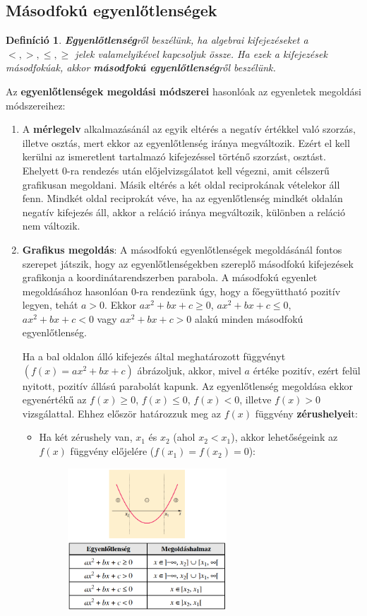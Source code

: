 \documentclass[12pt,a4paper]{article}
\newtheorem{definition}{Definíció} [section]
\begin{document}
\subsection{Másodfokú egyenlőtlenségek}
\begin{definition}
\textbf{Egyenlőtlenség}ről beszélünk, ha algebrai kifejezéseket a $<, >, \leq, \geq$ jelek valamelyikével kapcsoljuk össze. Ha ezek a kifejezések másodfokúak, akkor \textbf{másodfokú egyenlőtlenség}ről beszélünk.
\end{definition}
Az \textbf{egyenlőtlenségek megoldási módszerei} hasonlóak az egyenletek megoldási módszereihez:
\begin{enumerate}
\item A \textbf{mérlegelv} alkalmazásánál az egyik eltérés a negatív értékkel való szorzás, illetve osztás, mert ekkor az egyenlőtlenség iránya megváltozik. Ezért el kell kerülni az ismeretlent tartalmazó kifejezéssel történő szorzást, osztást. Ehelyett 0-ra rendezés után előjelvizsgálatot kell végezni, amit célszerű grafikusan megoldani. Másik eltérés a két oldal reciprokának vételekor áll fenn. Mindkét oldal reciprokát véve, ha az egyenlőtlenség mindkét oldalán negatív kifejezés áll, akkor a reláció iránya megváltozik, különben a reláció nem változik.
\item \textbf{Grafikus megoldás}: A másodfokú egyenlőtlenségek megoldásánál fontos szerepet játszik, hogy az egyenlőtlenségekben szereplő másodfokú kifejezések grafikonja a koordinátarendszerben parabola. A másodfokú egyenlet megoldásához hasonlóan 0-ra rendezünk úgy, hogy a főegyüttható pozitív legyen, tehát $a > 0$. Ekkor $ax^2 + bx + c \geq 0$, $ax^2 + bx + c \leq 0$, $ax^2 + bx + c < 0$ vagy $ax^2 + bx + c > 0$ alakú minden másodfokú egyenlőtlenség.

Ha a bal oldalon álló kifejezés által meghatározott függvényt $(f(x) = ax^2 + bx + c)$ ábrázoljuk, akkor, mivel $a$ értéke pozitív, ezért felül nyitott, pozitív állású parabolát kapunk. Az egyenlőtlenség megoldása ekkor egyenértékű az $f(x) \geq 0$, $f(x) \leq 0$, $f(x) < 0$, illetve $f(x) > 0$ vizsgálattal.
\newpage
Ehhez először határozzuk meg az $f(x)$ függvény \textbf{zérushelyei}t:
\begin{itemize}
\item Ha két zérushely van, $x_1$ és $x_2$ (ahol $x_2 < x_1$), akkor lehetőségeink az $f(x)$ függvény előjelére ($f(x_1) = f(x_2) = 0$):
\begin{figure}[h]
\centering
\includegraphics[width=0.6\textwidth]{masodfoku_egyenlotlenseg_1}
\end{figure}


\end{itemize}
\end{enumerate}
\end{document}
